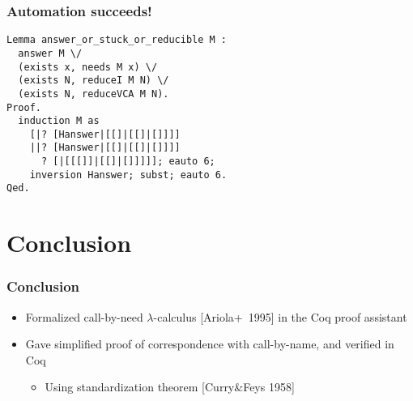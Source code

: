 \documentclass[dvipdfmx,cjk,xcolor=dvipsnames,envcountsect,notheorems,12pt]{beamer}
\theoremstyle{definition}
\begin{document}
\begin{frame}[fragile]
	\frametitle{Automation succeeds!}
\begin{lstlisting}
Lemma answer_or_stuck_or_reducible M :
  answer M \/
  (exists x, needs M x) \/
  (exists N, reduceI M N) \/
  (exists N, reduceVCA M N).
Proof.
  induction M as
    [|? [Hanswer|[[]|[[]|[]]]]
    ||? [Hanswer|[[]|[[]|[]]]]
      ? [|[[[]]|[[]|[]]]]]; eauto 6;
    inversion Hanswer; subst; eauto 6.
Qed.
\end{lstlisting}
\end{frame}

\section{Conclusion}

\begin{frame}
	\frametitle{Conclusion}
	\begin{itemize}
		\item Formalized call-by-need $\lambda$-calculus \mbox{[Ariola+ 1995]} in the Coq proof assistant
		\vfill
		\item Gave \alert{simplified proof} of correspondence with call-by-name, and verified in Coq
			\begin{itemize}
				\item Using standardization theorem [Curry\&Feys 1958]
			\end{itemize}
	\end{itemize}
\end{frame}
\end{document}
